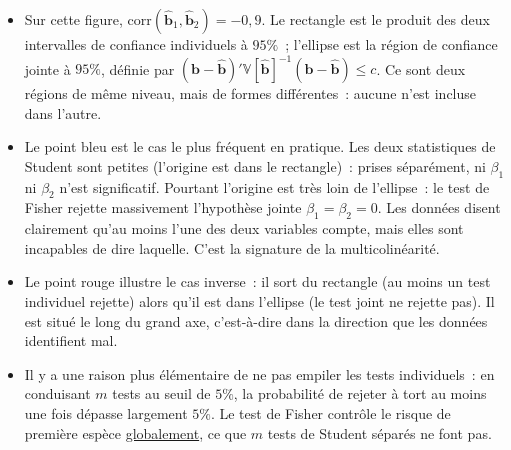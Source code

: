 \documentclass[10pt,a4paper]{article}
\theoremstyle{definition}
\renewcommand{\newline}{\unskip\par\vspace{1.5pt}}
\begin{document}
\begin{notes}

  \begin{itemize}

  \item Sur cette figure, $\mathrm{corr}(\hat{\mathbf b}_1, \hat{\mathbf b}_2)=-0{,}9$.
    Le rectangle est le produit des deux intervalles de confiance individuels à $95\%$~;
    l'ellipse est la région de confiance jointe à $95\%$, définie par
    $\left(\mathbf b - \hat{\mathbf b}\right)' \mathbb V[\hat{\mathbf b}]^{-1}
    \left(\mathbf b - \hat{\mathbf b}\right) \leq c$. Ce sont deux régions de même
    niveau, mais de formes différentes~: aucune n'est incluse dans l'autre.\newline

  \item Le point bleu est le cas le plus fréquent en pratique. Les deux statistiques
    de Student sont petites (l'origine est dans le rectangle)~: prises séparément, ni
    $\beta_1$ ni $\beta_2$ n'est significatif. Pourtant l'origine est très loin de
    l'ellipse~: le test de Fisher rejette massivement l'hypothèse jointe
    $\beta_1=\beta_2=0$. Les données disent clairement qu'au moins l'une des deux
    variables compte, mais elles sont incapables de dire laquelle. C'est la
    signature de la multicolinéarité.\newline

  \item Le point rouge illustre le cas inverse~: il sort du rectangle (au moins un test
    individuel rejette) alors qu'il est dans l'ellipse (le test joint ne rejette pas).
    Il est situé le long du grand axe, c'est-à-dire dans la direction que les données
    identifient mal.\newline

  \item Il y a une raison plus élémentaire de ne pas empiler les tests individuels~: en
    conduisant $m$ tests au seuil de $5\%$, la probabilité de rejeter à tort au moins
    une fois dépasse largement $5\%$. Le test de Fisher contrôle le risque de première
    espèce \underline{globalement}, ce que $m$ tests de Student séparés ne font pas.

  \end{itemize}

\end{notes}
\end{document}
